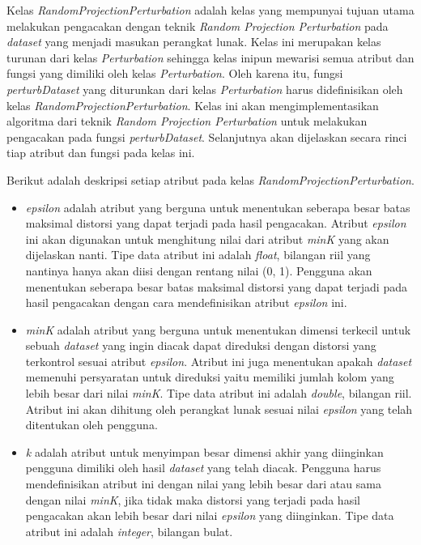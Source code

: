 Kelas \textit{RandomProjectionPerturbation} adalah kelas yang mempunyai tujuan utama melakukan pengacakan dengan teknik \textit{Random Projection Perturbation} pada \textit{dataset} yang menjadi masukan perangkat lunak. Kelas ini merupakan kelas turunan dari kelas \textit{Perturbation} sehingga kelas inipun mewarisi semua atribut dan fungsi yang dimiliki oleh kelas \textit{Perturbation}. Oleh karena itu, fungsi \textit{perturbDataset} yang diturunkan dari kelas \textit{Perturbation} harus didefinisikan oleh kelas \textit{RandomProjectionPerturbation}. Kelas ini akan mengimplementasikan algoritma dari teknik \textit{Random Projection Perturbation} untuk melakukan pengacakan pada fungsi \textit{perturbDataset}. Selanjutnya akan dijelaskan secara rinci tiap atribut dan fungsi pada kelas ini.

Berikut adalah deskripsi setiap atribut pada kelas \textit{RandomProjectionPerturbation}.
\begin{itemize}
	\item \textit{epsilon} adalah atribut yang berguna untuk menentukan seberapa besar batas maksimal distorsi yang dapat terjadi pada hasil pengacakan. Atribut \textit{epsilon} ini akan digunakan untuk menghitung nilai dari atribut \textit{minK} yang akan dijelaskan nanti. Tipe data atribut ini adalah \textit{float}, bilangan riil yang nantinya hanya akan diisi dengan rentang nilai (0, 1). Pengguna akan menentukan seberapa besar batas maksimal distorsi yang dapat terjadi pada hasil pengacakan dengan cara mendefinisikan atribut \textit{epsilon} ini.
	\item \textit{minK} adalah atribut yang berguna untuk menentukan dimensi terkecil untuk sebuah \textit{dataset} yang ingin diacak dapat direduksi dengan distorsi yang terkontrol sesuai atribut \textit{epsilon}. Atribut ini juga menentukan apakah \textit{dataset} memenuhi persyaratan untuk direduksi yaitu memiliki jumlah kolom yang lebih besar dari nilai \textit{minK}. Tipe data atribut ini adalah \textit{double}, bilangan riil. Atribut ini akan dihitung oleh perangkat lunak sesuai nilai \textit{epsilon} yang telah ditentukan oleh pengguna.
	\item \textit{k} adalah atribut untuk menyimpan besar dimensi akhir yang diinginkan pengguna dimiliki oleh hasil \textit{dataset} yang telah diacak. Pengguna harus mendefinisikan atribut ini dengan nilai yang lebih besar dari atau sama dengan nilai \textit{minK}, jika tidak maka distorsi yang terjadi pada hasil pengacakan akan lebih besar dari nilai \textit{epsilon} yang diinginkan. Tipe data atribut ini adalah \textit{integer}, bilangan bulat.
\end{itemize}

